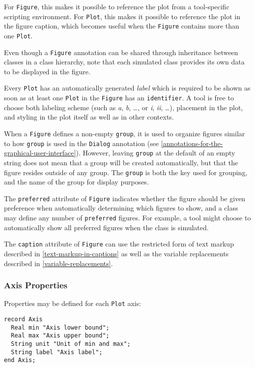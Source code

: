 \begin{nonnormative}
For \lstinline!Figure!, this makes it possible to reference the plot from a
tool-specific scripting environment. For \lstinline!Plot!, this makes it
possible to reference the plot in the figure caption, which becomes useful when
the \lstinline!Figure! contains more than one \lstinline!Plot!.
\end{nonnormative}

Even though a \lstinline!Figure! annotation can be shared through inheritance between classes in a class hierarchy, note that each simulated class provides
its own data to be displayed in the figure.

Every \lstinline!Plot! has an automatically generated \emph{label} which is
required to be shown as soon as at least one \lstinline!Plot! in the
\lstinline!Figure! has an \lstinline!identifier!.  A tool is free to choose both
labeling scheme (such as \emph{a}, \emph{b}, \dots, or \emph{i}, \emph{ii}, \dots), placement in the plot,
and styling in the plot itself as well as in other contexts.

When a \lstinline!Figure! defines a non-empty \lstinline!group!, it is used to
organize figures similar to how \lstinline!group! is used in the
\lstinline!Dialog! annotation (see \cref{annotations-for-the-graphical-user-interface}).  However, leaving \lstinline!group! at
the default of an empty string does not mean that a group will be created
automatically, but that the figure resides outside of any group. The
\lstinline!group! is both the key used for grouping, and the name of the group
for display purposes.

The \lstinline!preferred! attribute of \lstinline!Figure! indicates whether the figure should be given preference when automatically determining which figures to show,
and a class may define any number of \lstinline!preferred! figures.  For example, a tool might choose to automatically show all preferred figures when the class is simulated.

The \lstinline!caption! attribute of \lstinline!Figure! can use the restricted
form of text markup described in \cref{text-markup-in-captions} as well as
the variable replacements described in \cref{variable-replacements}.

\subsubsection{Axis Properties}\label{axis-properties}
Properties may be defined for each \lstinline!Plot! axis:
\begin{lstlisting}[language=modelica]
record Axis
  Real min "Axis lower bound";
  Real max "Axis upper bound";
  String unit "Unit of min and max";
  String label "Axis label";
end Axis;
\end{lstlisting}

